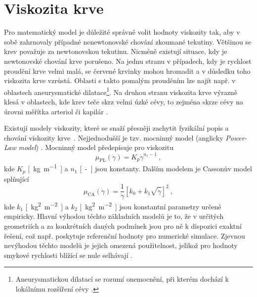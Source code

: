 \section*{\fontsize{11}{15}\selectfont Viskozita krve}

Pro matematický model je důležité správně volit hodnoty viskozity tak, aby v sobě zahrnovaly případné nenewtonovské chování zkoumané tekutiny. Většinou se krev považuje za newtonovskou tekutinu. Nicméně existují situace, kdy je newtonovské chování krve porušeno. Na jednu stranu v případech, kdy je rychlost proudění krve velmi malá, se červené krvinky mohou hromadit a v důsledku toho viskozita krve vzrůstá.
Oblasti s takto pomalým prouděním lze najít např. v oblastech aneurysmatické dilatace\footnote{Aneurysmatickou dilatací se rozumí onemocnění, při kterém dochází k lokálnímu rozšíření cévy \cite{Syed1997}.}. Na druhou stranu viskozita krve výrazně klesá v oblastech, kde krev teče skrz velmi úzké cévy, to zejména skrze cévy na úrovni měřítka arteriol či kapilár \cite{Saloner2019}.
	
Existují modely viskozity, které se snaží přesněji zachytit fyzikální popis a chování viskozity krve~\cite{Saloner2019, Eichler2023, Boyd2007}. Nejjednodušší je tzv. mocninný model (anglicky \textit{Power-Law model}) \cite{Sequeira}. Mocninný model předepisuje pro viskozitu 
\begin{equation}\label{eq:power-law}
\mu _{\text{PL}} (\dot{\gamma}) = K_p  \dot{\gamma} ^{n_1-1} \ ,
\end{equation}
kde $ K_p$ \si{[kg.m^{-1}]} a $ n_1 $ \si{[-]} jsou konstanty. Dalším modelem je Cassonův model  \cite{Boyd2007} splňující
\begin{equation}\label{eq:Casson}
	\mu _{\text{CA}} (\dot{\gamma}) = \frac{1}{\dot{\gamma}} \left[ k_{0} + k_{1} \sqrt{\dot{\gamma}} \right]^2 \ ,
\end{equation}
kde $ k_1$ \si{[kg^{2}.m^{-2}]} a $  k_2 $ \si{[kg^{2}.m^{-2}]} jsou konstantní parametry určené empiricky. Hlavní výhodou těchto základních modelů je to, že v určitých geometriích a za konkrétních daných podmínek jsou pro ně k dispozici exaktní řešení, což např. poskytuje referenční hodnoty pro numerické simulace. Zjevnou nevýhodou těchto modelů je jejich omezená použitelnost, jelikož pro hodnoty smykové rychlosti blížící se nule selhávají \cite{Boyd2007}.

